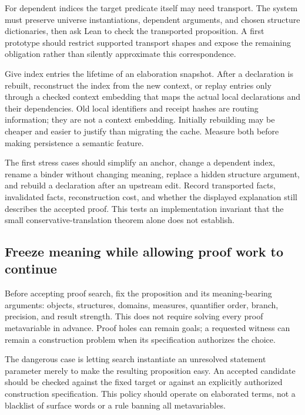 \documentclass[11pt,letterpaper]{article}
\theoremstyle{definition}\newtheorem{definition}[proposition]{Definition}
\theoremstyle{remark}\newtheorem{remark}[proposition]{Remark}
\begin{document}
For dependent indices the target predicate itself may need transport. The
system must preserve universe instantiations, dependent arguments, and chosen
structure dictionaries, then ask Lean to check the transported proposition.
A first prototype should restrict supported transport shapes and expose the
remaining obligation rather than silently approximate this correspondence.

Give index entries the lifetime of an elaboration snapshot. After a declaration
is rebuilt, reconstruct the index from the new context, or replay entries only
through a checked context embedding that maps the actual local declarations
and their dependencies. Old local identifiers and receipt hashes are routing
information; they are not a context embedding. Initially rebuilding may be
cheaper and easier to justify than migrating the cache. Measure both before
making persistence a semantic feature.

The first stress cases should simplify an anchor, change a dependent index,
rename a binder without changing meaning, replace a hidden structure argument,
and rebuild a declaration after an upstream edit. Record transported facts,
invalidated facts, reconstruction cost, and whether the displayed explanation
still describes the accepted proof. This tests an implementation invariant
that the small conservative-translation theorem alone does not establish.

\subsection{Freeze meaning while allowing proof work to continue}
Before accepting proof search, fix the proposition and its meaning-bearing
arguments: objects, structures, domains, measures, quantifier order, branch,
precision, and result strength. This does not require solving every proof
metavariable in advance. Proof holes can remain goals; a requested witness can
remain a construction problem when its specification authorizes the choice.

The dangerous case is letting search instantiate an unresolved statement
parameter merely to make the resulting proposition easy. An accepted candidate
should be checked against the fixed target or against an explicitly authorized
construction specification. This policy should operate on elaborated terms,
not a blacklist of surface words or a rule banning all metavariables.
\end{document}
